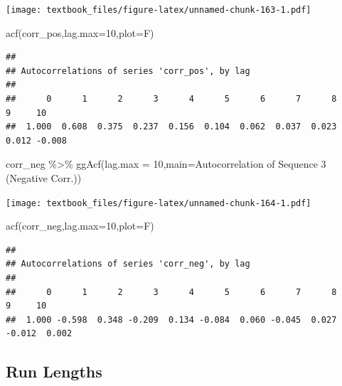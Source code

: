 \documentclass[
  11pt,
]{book}
\newenvironment{Shaded}{\begin{snugshade}}{\end{snugshade}}
\newcommand{\AttributeTok}[1]{\textcolor[rgb]{0.77,0.63,0.00}{#1}}
\newcommand{\DecValTok}[1]{\textcolor[rgb]{0.00,0.00,0.81}{#1}}
\newcommand{\FunctionTok}[1]{\textcolor[rgb]{0.00,0.00,0.00}{#1}}
\newcommand{\NormalTok}[1]{#1}
\newcommand{\SpecialCharTok}[1]{\textcolor[rgb]{0.00,0.00,0.00}{#1}}
\newcommand{\StringTok}[1]{\textcolor[rgb]{0.31,0.60,0.02}{#1}}
\theoremstyle{definition}
\theoremstyle{definition}
\theoremstyle{definition}
\theoremstyle{definition}
\theoremstyle{remark}
\begin{document}
\texttt{[image: textbook\_files/figure-latex/unnamed-chunk-163-1.pdf]}

\begin{Shaded}
\begin{Highlighting}[]
\FunctionTok{acf}\NormalTok{(corr\_pos,}\AttributeTok{lag.max=}\DecValTok{10}\NormalTok{,}\AttributeTok{plot=}\NormalTok{F)}
\end{Highlighting}
\end{Shaded}

\begin{verbatim}
## 
## Autocorrelations of series 'corr_pos', by lag
## 
##      0      1      2      3      4      5      6      7      8      9     10 
##  1.000  0.608  0.375  0.237  0.156  0.104  0.062  0.037  0.023  0.012 -0.008
\end{verbatim}

\newpage

\begin{Shaded}
\begin{Highlighting}[]
\NormalTok{corr\_neg }\SpecialCharTok{\%\textgreater{}\%} \FunctionTok{ggAcf}\NormalTok{(}\AttributeTok{lag.max =} \DecValTok{10}\NormalTok{,}\AttributeTok{main=}\StringTok{\textquotesingle{}Autocorrelation of Sequence 3 (Negative Corr.)\textquotesingle{}}\NormalTok{)}
\end{Highlighting}
\end{Shaded}

\texttt{[image: textbook\_files/figure-latex/unnamed-chunk-164-1.pdf]}

\begin{Shaded}
\begin{Highlighting}[]
\FunctionTok{acf}\NormalTok{(corr\_neg,}\AttributeTok{lag.max=}\DecValTok{10}\NormalTok{,}\AttributeTok{plot=}\NormalTok{F)}
\end{Highlighting}
\end{Shaded}

\begin{verbatim}
## 
## Autocorrelations of series 'corr_neg', by lag
## 
##      0      1      2      3      4      5      6      7      8      9     10 
##  1.000 -0.598  0.348 -0.209  0.134 -0.084  0.060 -0.045  0.027 -0.012  0.002
\end{verbatim}

\newpage

\hypertarget{run-lengths}{%
\subsection{Run Lengths}\label{run-lengths}}
\end{document}
